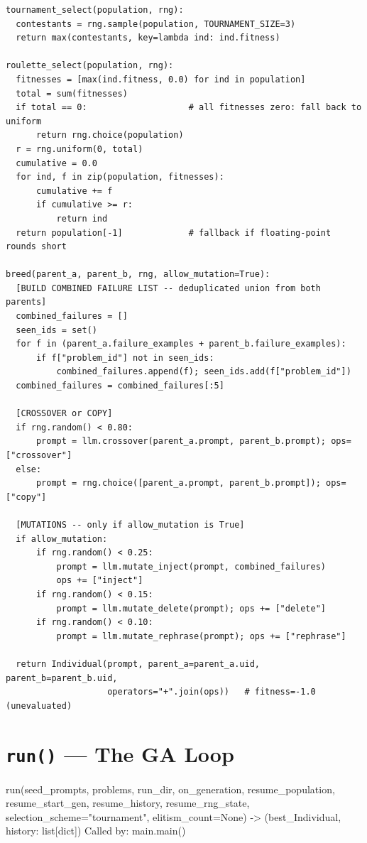 \documentclass[11pt,a4paper]{report}
\newcommand{\fn}[1]{\texttt{#1}}
\begin{document}
\begin{lstlisting}[style=chain]
tournament_select(population, rng):
  contestants = rng.sample(population, TOURNAMENT_SIZE=3)
  return max(contestants, key=lambda ind: ind.fitness)

roulette_select(population, rng):
  fitnesses = [max(ind.fitness, 0.0) for ind in population]
  total = sum(fitnesses)
  if total == 0:                    # all fitnesses zero: fall back to uniform
      return rng.choice(population)
  r = rng.uniform(0, total)
  cumulative = 0.0
  for ind, f in zip(population, fitnesses):
      cumulative += f
      if cumulative >= r:
          return ind
  return population[-1]             # fallback if floating-point rounds short

breed(parent_a, parent_b, rng, allow_mutation=True):
  [BUILD COMBINED FAILURE LIST -- deduplicated union from both parents]
  combined_failures = []
  seen_ids = set()
  for f in (parent_a.failure_examples + parent_b.failure_examples):
      if f["problem_id"] not in seen_ids:
          combined_failures.append(f); seen_ids.add(f["problem_id"])
  combined_failures = combined_failures[:5]

  [CROSSOVER or COPY]
  if rng.random() < 0.80:
      prompt = llm.crossover(parent_a.prompt, parent_b.prompt); ops=["crossover"]
  else:
      prompt = rng.choice([parent_a.prompt, parent_b.prompt]); ops=["copy"]

  [MUTATIONS -- only if allow_mutation is True]
  if allow_mutation:
      if rng.random() < 0.25:
          prompt = llm.mutate_inject(prompt, combined_failures)
          ops += ["inject"]
      if rng.random() < 0.15:
          prompt = llm.mutate_delete(prompt); ops += ["delete"]
      if rng.random() < 0.10:
          prompt = llm.mutate_rephrase(prompt); ops += ["rephrase"]

  return Individual(prompt, parent_a=parent_a.uid, parent_b=parent_b.uid,
                    operators="+".join(ops))   # fitness=-1.0 (unevaluated)
\end{lstlisting}

\section{\fn{run()} --- The GA Loop}

\begin{spec}{run(seed\_prompts, problems, run\_dir, on\_generation,
resume\_population, resume\_start\_gen, resume\_history, resume\_rng\_state,
selection\_scheme="tournament", elitism\_count=None)
-> (best\_Individual, history: list[dict])}
Called by: main.main()
\end{spec}
\end{document}
